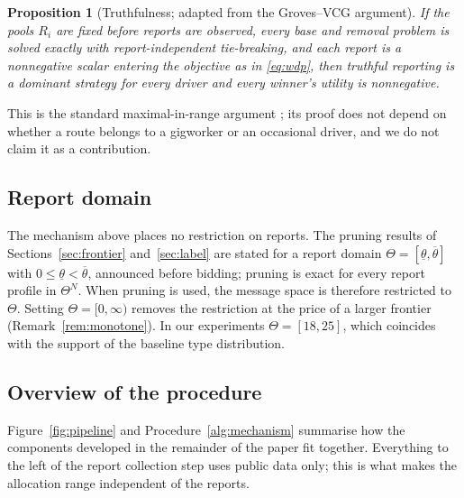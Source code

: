 \documentclass[review,12pt]{elsarticle}
\newtheorem{proposition}[theorem]{Proposition}
\theoremstyle{definition}
\theoremstyle{remark}
\newcommand{\lth}{\underline{\theta}}
\newcommand{\uth}{\overline{\theta}}
\begin{document}
\begin{proposition}[Truthfulness; adapted from the Groves--VCG argument]
\label{prop:dsic}
If the pools $R_i$ are fixed before reports are observed, every base and
removal problem is solved exactly with report-independent tie-breaking, and
each report is a nonnegative scalar entering the objective as in
\eqref{eq:wdp}, then truthful reporting is a dominant strategy for every
driver and every winner's utility is nonnegative.
\end{proposition}

This is the standard maximal-in-range argument
\citep{nisan2007computationally}; its proof does not depend on whether a
route belongs to a gigworker or an occasional driver, and we do not claim
it as a contribution.

\subsection{Report domain}
\label{sec:reportdomain}

The mechanism above places no restriction on reports. The pruning results
of Sections~\ref{sec:frontier} and~\ref{sec:label} are stated for a report
domain $\Theta=[\lth,\uth]$ with $0\le\lth<\uth$, announced before bidding;
pruning is exact for every report profile in $\Theta^N$. When pruning is
used, the message space is therefore restricted to $\Theta$. Setting
$\Theta=[0,\infty)$ removes the restriction at the price of a larger
frontier (Remark~\ref{rem:monotone}). In our experiments $\Theta=[18,25]$,
which coincides with the support of the baseline type distribution.

\subsection{Overview of the procedure}
\label{sec:overview}

Figure~\ref{fig:pipeline} and Procedure~\ref{alg:mechanism} summarise how
the components developed in the remainder of the paper fit together.
Everything to the left of the report collection step uses public data only;
this is what makes the allocation range independent of the reports.
\end{document}
